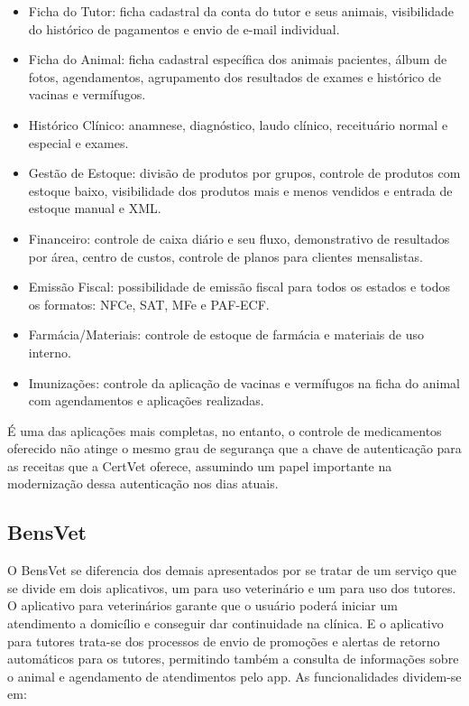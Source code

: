 \documentclass[
    12pt,               %
    openright,          %
    oneside,
    a4paper,            %
    BIBLATEX,           %
    TODO,               %
    english,            %
    brazil              %
    ]{ifsp-spo-inf-ctds}
\begin{document}
\begin{itemize}
    \item Ficha do Tutor: ficha cadastral da conta do tutor e seus animais, visibilidade do histórico de pagamentos e envio de e-mail individual.
    \item Ficha do Animal: ficha cadastral específica dos animais pacientes, álbum de fotos, agendamentos, agrupamento dos resultados de exames e histórico de vacinas e vermífugos.
    \item Histórico Clínico: anamnese, diagnóstico, laudo clínico, receituário normal e especial e exames.
    \item Gestão de Estoque: divisão de produtos por grupos, controle de produtos com estoque baixo, visibilidade dos produtos mais e menos vendidos e entrada de estoque manual e XML.
    \item Financeiro: controle de caixa diário e seu fluxo, demonstrativo de resultados por área, centro de custos, controle de planos para clientes mensalistas.
    \item Emissão Fiscal: possibilidade de emissão fiscal para todos os estados e todos os formatos: NFCe, SAT, MFe e PAF-ECF.
    \item Farmácia/Materiais: controle de estoque de farmácia e materiais de uso interno.
    \item Imunizações: controle da aplicação de vacinas e vermífugos na ficha do animal com agendamentos e aplicações realizadas.
\end{itemize}

É uma das aplicações mais completas, no entanto, o controle de medicamentos oferecido não atinge o mesmo grau de segurança que a chave de autenticação para as receitas que a CertVet oferece, assumindo um papel importante na modernização dessa autenticação nos dias atuais.

\subsection{BensVet}
O BensVet se diferencia dos demais apresentados por se tratar de um serviço que se divide em dois aplicativos, um para uso veterinário e um para uso dos tutores. O aplicativo para veterinários garante que o usuário poderá iniciar um atendimento a domicílio e conseguir  dar continuidade na clínica. E o aplicativo para tutores trata-se dos processos de envio  de promoções e alertas de retorno automáticos para os tutores, permitindo também a consulta de  informações sobre o animal e agendamento de atendimentos pelo app. As funcionalidades dividem-se em:
\end{document}

